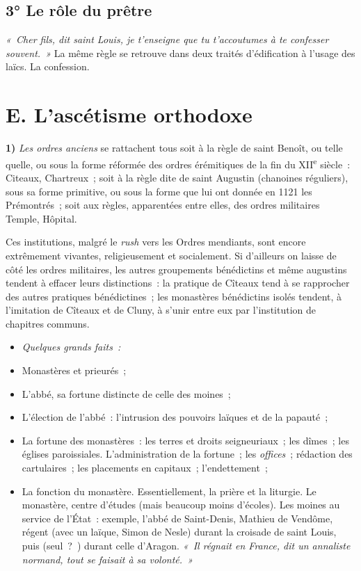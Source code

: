 \documentclass[french,twoside]{book} %
\newlength{\listmod}
\newcommand{\listhead}[1]{\hspace{-1\listmod}\emph{#1}}
\newcommand{\labelchar}[1]{\textbf{\color{rubric} #1}}
\begin{document}
\subsection[{3° Le rôle du prêtre}]{3° Le rôle du prêtre}
\noindent \emph{« Cher fils, dit saint Louis, je t’enseigne que tu t’accoutumes à te confesser souvent. »} La même règle se retrouve dans deux traités d’édification à l’usage des laïcs. La confession.
\section[{E. L’ascétisme orthodoxe}]{E. L’ascétisme orthodoxe}
\label{c10e}
\noindent \labelchar{1)} {\itshape Les ordres anciens} se rattachent tous soit à la règle de saint Benoît, ou telle quelle, ou sous la forme réformée des ordres érémitiques de la fin du XII\textsuperscript{e} siècle : Citeaux, Chartreux ; soit à la règle dite de saint Augustin (chanoines réguliers), sous sa forme primitive, ou sous la forme que lui ont donnée en 1121 les Prémontrés ;  
\label{p110} soit aux règles, apparentées entre elles, des ordres militaires Temple, Hôpital.\par
Ces institutions, malgré le {\itshape rush} vers les Ordres mendiants, sont encore extrêmement vivantes, religieusement et socialement. Si d’ailleurs on laisse de côté les ordres militaires, les autres groupements bénédictins et même augustins tendent à effacer leurs distinctions : la pratique de Cîteaux tend à se rapprocher des autres pratiques bénédictines ; les monastères bénédictins isolés tendent, à l’imitation de Cîteaux et de Cluny, à s’unir entre eux par l’institution de chapitres communs.\par

\begin{itemize}[itemsep=0pt,]
\item[]\listhead{Quelques grands faits :}
\item Monastères et prieurés ;
\item L’abbé, sa fortune distincte de celle des moines ;
\item L’élection de l’abbé : l’intrusion des pouvoirs laïques et de la papauté ;
\item La fortune des monastères : les terres et droits seigneuriaux ; les dîmes ; les églises paroissiales. L’administration de la fortune ; les \emph{offices} ; rédaction des cartulaires ; les placements en capitaux ; l’endettement ;
\item La fonction du monastère. Essentiellement, la prière et la liturgie. Le monastère, centre d’études (mais beaucoup moins d’écoles). Les moines au service de l’État : exemple, l’abbé de Saint-Denis, Mathieu de Vendôme, régent (avec un laïque, Simon de Nesle) durant la croisade de saint Louis, puis (seul ? ) durant celle d’Aragon. \emph{« Il régnait en France, dit un annaliste normand, tout se faisait à sa volonté. »}
\end{itemize}
\end{document}
